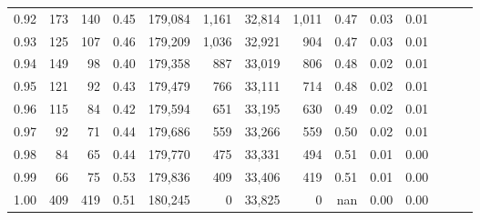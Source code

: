 \begin{tabular}{rrrrrrrrrrrrrr}
0.92 &    173 &  140 &  0.45 &  179,084 &    1,161 &  32,814 &   1,011 &  0.47 &  0.03 &      0.01 \\
0.93 &    125 &  107 &  0.46 &  179,209 &    1,036 &  32,921 &     904 &  0.47 &  0.03 &      0.01 \\
0.94 &    149 &   98 &  0.40 &  179,358 &      887 &  33,019 &     806 &  0.48 &  0.02 &      0.01 \\
0.95 &    121 &   92 &  0.43 &  179,479 &      766 &  33,111 &     714 &  0.48 &  0.02 &      0.01 \\
0.96 &    115 &   84 &  0.42 &  179,594 &      651 &  33,195 &     630 &  0.49 &  0.02 &      0.01 \\
0.97 &     92 &   71 &  0.44 &  179,686 &      559 &  33,266 &     559 &  0.50 &  0.02 &      0.01 \\
0.98 &     84 &   65 &  0.44 &  179,770 &      475 &  33,331 &     494 &  0.51 &  0.01 &      0.00 \\
0.99 &     66 &   75 &  0.53 &  179,836 &      409 &  33,406 &     419 &  0.51 &  0.01 &      0.00 \\
1.00 &    409 &  419 &  0.51 &  180,245 &        0 &  33,825 &       0 &   nan &  0.00 &      0.00 \\
\bottomrule
\end{tabular}
